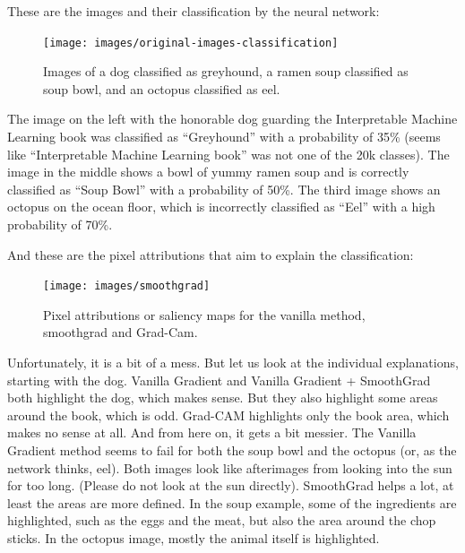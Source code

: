 \documentclass[12pt,]{krantz}
\begin{document}
These are the images and their classification by the neural network:

\begin{figure}

{\centering \texttt{[image: images/original-images-classification]} 

}

\caption{Images of a dog classified as greyhound, a ramen soup classified as soup bowl, and an octopus classified as eel.}\label{fig:unnamed-chunk-62}
\end{figure}

The image on the left with the honorable dog guarding the Interpretable
Machine Learning book was classified as ``Greyhound'' with a probability
of 35\% (seems like ``Interpretable Machine Learning book'' was not one
of the 20k classes). The image in the middle shows a bowl of yummy ramen
soup and is correctly classified as ``Soup Bowl'' with a probability of
50\%. The third image shows an octopus on the ocean floor, which is
incorrectly classified as ``Eel'' with a high probability of 70\%.

And these are the pixel attributions that aim to explain the
classification:

\begin{figure}

{\centering \texttt{[image: images/smoothgrad]} 

}

\caption{Pixel attributions or saliency maps for the vanilla method, smoothgrad and Grad-Cam.}\label{fig:unnamed-chunk-63}
\end{figure}

Unfortunately, it is a bit of a mess. But let us look at the individual
explanations, starting with the dog. Vanilla Gradient and Vanilla
Gradient + SmoothGrad both highlight the dog, which makes sense. But
they also highlight some areas around the book, which is odd. Grad-CAM
highlights only the book area, which makes no sense at all. And from
here on, it gets a bit messier. The Vanilla Gradient method seems to
fail for both the soup bowl and the octopus (or, as the network thinks,
eel). Both images look like afterimages from looking into the sun for
too long. (Please do not look at the sun directly). SmoothGrad helps a
lot, at least the areas are more defined. In the soup example, some of
the ingredients are highlighted, such as the eggs and the meat, but also
the area around the chop sticks. In the octopus image, mostly the animal
itself is highlighted.
\end{document}
